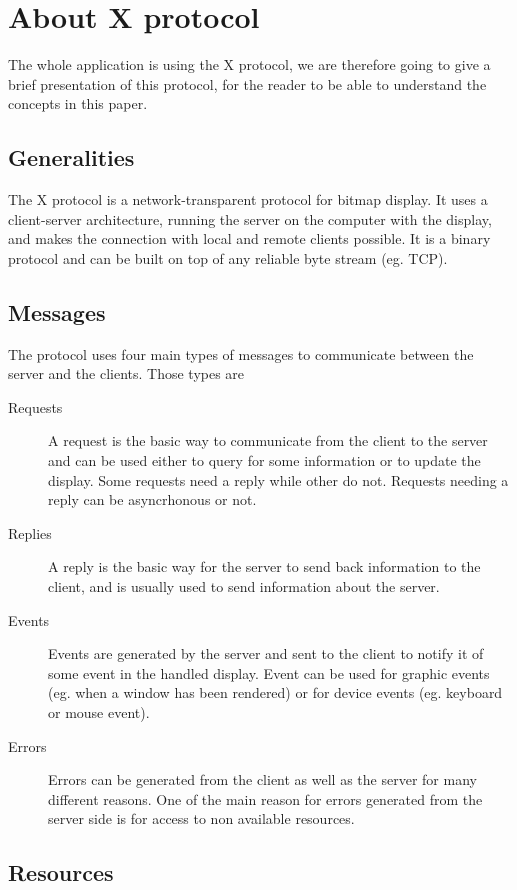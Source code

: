 \section{About X protocol}
The whole application is using the X protocol, we are therefore going
to give a brief presentation of this protocol, for the reader to be able 
to understand the concepts in this paper.
\subsection{Generalities}
The X protocol is a network-transparent protocol for bitmap display. 
It uses a client-server architecture, running the server on the computer 
with the display, and makes the connection with local and remote clients possible. 
It is a binary protocol and can be built on top of any reliable byte stream (eg. TCP).
\subsection{Messages}
The protocol uses four main types of messages to communicate between 
the server and the clients. Those types are
\begin{description}
\item[Requests] A request is the basic way to communicate from the client 
  to the server and can be used either to query for some information or to 
  update the display. Some requests need a reply while other do not. 
  Requests needing a reply can be asyncrhonous or not.
\item[Replies] A reply is the basic way for the server to send back
  information to the client, and is usually used to send information about the server.
\item[Events] Events are generated by the server and sent to the client to notify it of 
  some event in the handled display. Event can be used for graphic events 
  (eg. when a window has been rendered) or for device events (eg. keyboard or mouse event).
\item[Errors] Errors can be generated from the client as well as the server
  for many different reasons. One of the main reason for errors generated 
  from the server side is for access to non available resources.
\end{description}
\subsection{Resources}
